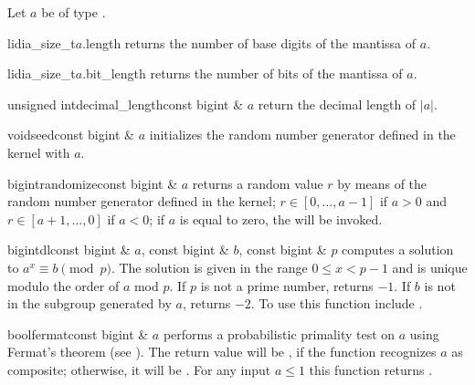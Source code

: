 \BASIC

Let $a$ be of type .

\begin{cfcode}{lidia_size_t}{$a$.length}{}
  returns the number of base digits of the mantissa of $a$.
\end{cfcode}

\begin{cfcode}{lidia_size_t}{$a$.bit_length}{}
  returns the number of bits of the mantissa of $a$.
\end{cfcode}

\begin{fcode}{unsigned int}{decimal_length}{const bigint & $a$}
  return the decimal length of $|a|$.
\end{fcode}

\begin{fcode}{void}{seed}{const bigint & $a$}
  initializes the random number generator defined in the kernel with $a$.
\end{fcode}

\begin{fcode}{bigint}{randomize}{const bigint & $a$}
  returns a random value $r$ by means of the random number generator defined in the kernel; $r
  \in [0, \dots, a-1]$ if $a > 0$ and $r \in [a+1, \dots, 0]$ if $a < 0$; if $a$ is equal to
  zero, the \LEH will be invoked.
\end{fcode}



\HIGH

\begin{fcode}{bigint}{dl}{const bigint & $a$, const bigint & $b$, const bigint & $p$}
  computes a solution to $a^x \equiv b \pmod{p}$.  The solution is given in the range $0 \leq x
  < p - 1$ and is unique modulo the order of $a$ mod $p$.  If $p$ is not a prime number,
   returns $-1$.  If $b$ is not in the subgroup generated by $a$,  returns
  $-2$.  To use this function include .
\end{fcode}

\begin{fcode}{bool}{fermat}{const bigint & $a$}
  performs a probabilistic primality test on $a$ using Fermat's theorem (see \cite{Cohen:1995}).
  The return value will be \FALSE, if the function recognizes $a$ as composite; otherwise, it
  will be \TRUE.  For any input $a \leq 1$ this function returns \FALSE.
\end{fcode}

